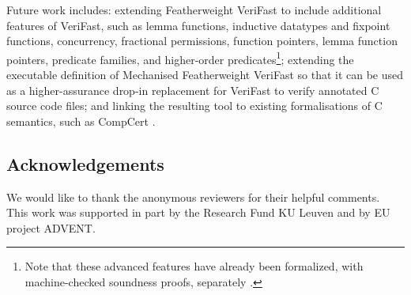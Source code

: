 \documentclass{CSML}
\theoremstyle{definition}\newtheorem{notation}[thm]{Notation}
\theoremstyle{plain}\newtheorem{satz}[thm]{Satz}
\begin{document}
Future work includes: extending Featherweight VeriFast to include 
additional features of VeriFast, such as lemma functions, inductive 
datatypes and fixpoint functions, concurrency, fractional permissions, 
function pointers, lemma function pointers, predicate families, and 
higher-order predicates\footnote{Note that these advanced features
have already been formalized, with machine-checked soundness proofs,
separately \cite{DBLP:conf/fm/JacobsSP11,DBLP:conf/popl/JacobsP11}.};
extending the executable definition of Mechanised 
Featherweight VeriFast so that it can be used as a higher-assurance 
drop-in replacement for VeriFast to verify annotated C source code files; 
and linking the resulting tool to existing formalisations of C semantics, 
such as CompCert \cite{Leroy-Compcert-CACM}.

\subsection*{Acknowledgements}

We would like to thank the anonymous reviewers for their helpful comments. This work was supported in part by the Research Fund KU Leuven and by EU project ADVENT.





\newpage

\theendnotes
\end{document}
